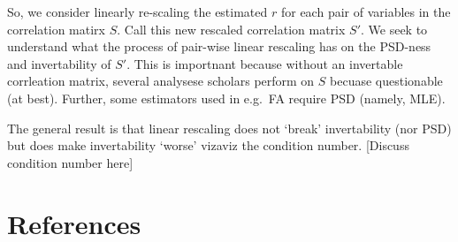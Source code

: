 \documentclass[
  12pt,
]{article}
\theoremstyle{plain}
\theoremstyle{definition}
\theoremstyle{remark}
\begin{document}
So, we consider linearly re-scaling the estimated \(r\) for each pair of
variables in the correlation matirx \(S\). Call this new rescaled
correlation matrix \(S'\). We seek to understand what the process of
pair-wise linear rescaling has on the PSD-ness and invertability of
\(S'\). This is importnant because without an invertable corrleation
matrix, several analysese scholars perform on \(S\) becuase questionable
(at best). Further, some estimators used in e.g.~FA require PSD (namely,
MLE).

The general result is that linear rescaling does not `break'
invertability (nor PSD) but does make invertability `worse' vizaviz the
condition number. {[}Discuss condition number here{]}

\newpage

\section{References}\label{references}
\end{document}
